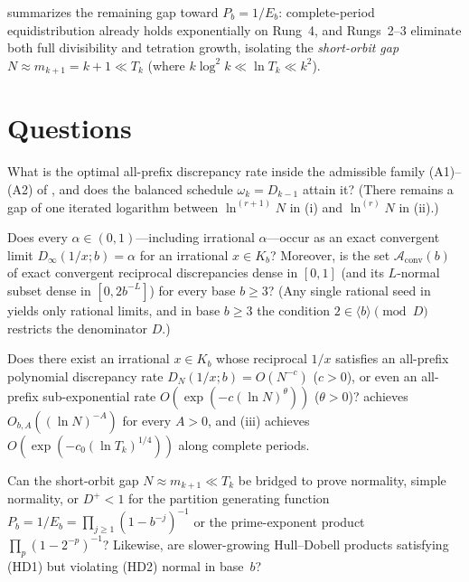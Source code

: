 \documentclass[11pt]{article}
\begin{document}
 summarizes the remaining gap toward $P_b=1/E_b$: complete-period equidistribution already holds exponentially on Rung~4, and Rungs~2--3 eliminate both full divisibility and tetration growth, isolating the \emph{short-orbit gap} $N\approx m_{k+1}=k+1\ll T_k$ (where $k\log^2 k\ll\ln T_k\ll k^2$).

\section{Questions}\label{sec:questions}

\begin{question}\label{q:gap}
What is the optimal all-prefix discrepancy rate inside the admissible family \textup{(A1)}--\textup{(A2)} of , and does the balanced schedule $\omega_k=D_{k-1}$ attain it? (There remains a gap of one iterated logarithm between $\ln^{(r+1)}N$ in (i) and $\ln^{(r)}N$ in (ii).)
\end{question}

\begin{question}\label{q:convergent-irrational}
Does every $\alpha\in(0,1)$---including irrational $\alpha$---occur as an exact convergent limit $D_\infty(1/x;b)=\alpha$ for an irrational $x\in K_b$? Moreover, is the set $\mathcal A_{\mathrm{conv}}(b)$ of exact convergent reciprocal discrepancies dense in $[0,1]$ (and its $L$-normal subset dense in $[0,2b^{-L}]$) for every base $b\ge3$? (Any single rational seed in  yields only rational limits, and in base $b\ge3$ the condition $2\in\langle b\rangle\pmod D$ restricts the denominator $D$.)
\end{question}

\begin{question}\label{q:poly-rate}
Does there exist an irrational $x\in K_b$ whose reciprocal $1/x$ satisfies an all-prefix polynomial discrepancy rate $D_N(1/x;b)=O(N^{-c})$ ($c>0$), or even an all-prefix sub-exponential rate $O(\exp(-c(\ln N)^\theta))$ ($\theta>0$)?  achieves $O_{b,A}((\ln N)^{-A})$ for every $A>0$, and (iii) achieves $O(\exp(-c_0(\ln T_k)^{1/4}))$ along complete periods.
\end{question}

\begin{question}\label{q:partition-short-orbit}
Can the short-orbit gap $N\approx m_{k+1}\ll T_k$ be bridged to prove normality, simple normality, or $D^+<1$ for the partition generating function $P_b=1/E_b=\prod_{j\ge1}(1-b^{-j})^{-1}$ or the prime-exponent product $\prod_p(1-2^{-p})^{-1}$? Likewise, are slower-growing Hull--Dobell products satisfying \textup{(HD1)} but violating \textup{(HD2)} normal in base~$b$?
\end{question}
\end{document}

